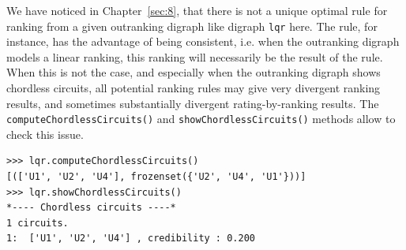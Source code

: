We have noticed in Chapter~\ref{sec:8}, that there is not a unique optimal rule for ranking from a given outranking digraph like digraph \texttt{lqr} here. The \Copeland rule, for instance, has the advantage of being \Condorcet consistent, i.e. when the outranking digraph models a linear ranking, this ranking will necessarily be the result of the \Copeland rule. When this is not the case, and especially when the outranking digraph shows chordless circuits, all potential ranking rules may give very divergent ranking results, and sometimes substantially divergent rating-by-ranking results. The \texttt{computeChordlessCircuits()} and \texttt{showChordlessCircuits()} methods allow to check this issue.
\begin{lstlisting}
>>> lqr.computeChordlessCircuits()
[(['U1', 'U2', 'U4'], frozenset({'U2', 'U4', 'U1'}))]
>>> lqr.showChordlessCircuits()
*---- Chordless circuits ----*
1 circuits.
1:  ['U1', 'U2', 'U4'] , credibility : 0.200
\end{lstlisting}

